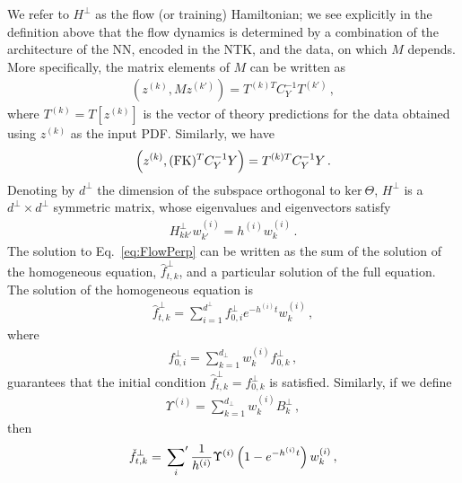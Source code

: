 We refer to $H^\perp$ as the flow (or training) Hamiltonian; we see explicitly in the definition above that
the flow dynamics is determined by a combination of the architecture of the NN, encoded in the NTK, and the
data, on which $M$ depends. More specifically, the matrix elements of $M$ can be written as
\begin{align}
    \label{eq:MMatElems}
    \left(z^{(k)}, M z^{(k')}\right) = T^{(k)T} C_Y^{-1} T^{(k')}\, ,
\end{align}
where $T^{(k)} = T[z^{(k)}]$ is the vector of theory predictions for the data obtained using $z^{(k)}$ as the
input PDF. Similarly, we have
\begin{align}
    \label{eq:BMatElems}
    \left(z^{(k)}, (\mathrm{FK})^T C_Y^{-1} Y\right) = T^{(k)T} C_Y^{-1} Y\, .
\end{align}
Denoting by $d^\perp$ the dimension of the subspace orthogonal to $\text{ker}\ \Theta$, $H^\perp$ is
a $d^\perp\times d^\perp$ symmetric matrix, whose eigenvalues and eigenvectors satisfy
\begin{align}
    H^\perp_{kk'} w^{(i)}_{k'} = h^{(i)} w^{(i)}_{k}\, .
\end{align}
The solution to Eq.~\eqref{eq:FlowPerp} can be written as the sum of the solution of the
homogeneous equation, $\hat{f}^{\perp}_{t,k}$, and a particular solution of the full equation.
The solution of the homogeneous equation is
\begin{align}
    \label{eq:HomoSoln}
    \hat{f}^{\perp}_{t,k} = \sum_{i=1}^{d^\perp} f^{\perp}_{0,i} e^{-h^{(i)}t} w^{(i)}_k\, ,
\end{align}
where
\begin{align}
    \label{eq:InitialCi}
    f^{\perp}_{0,i} = \sum_{k=1}^{d_\perp} w^{(i)}_k f^\perp_{0,k}\, ,
\end{align}
guarantees that the initial condition $\hat{f}^\perp_{t,k}=f^\perp_{0,k}$ is
satisfied. Similarly, if we define
\begin{align}
    \label{eq:BiDef}
    \Upsilon^{(i)} = \sum_{k=1}^{d_\perp} w^{(i)}_k B^\perp_{k}\, ,
\end{align}
then
\begin{align}
    \label{eq:PartSol}
    \check{f}^\perp_{t,k} = \sideset{}{'}\sum_{i} \frac{1}{h^{(i)}} \Upsilon^{(i)}
        \left(1 - e^{-h^{(i)}t}\right) w^{(i)}_k\, ,
\end{align}
